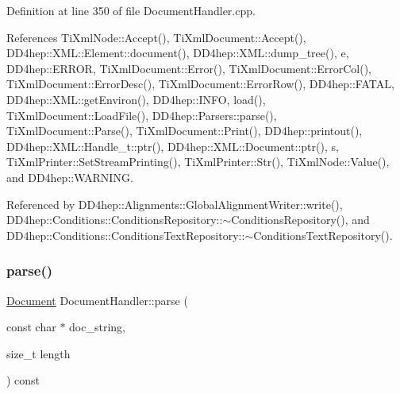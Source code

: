 Definition at line 350 of file Document\+Handler.\+cpp.



References Ti\+Xml\+Node\+::\+Accept(), Ti\+Xml\+Document\+::\+Accept(), D\+D4hep\+::\+X\+M\+L\+::\+Element\+::document(), D\+D4hep\+::\+X\+M\+L\+::dump\+\_\+tree(), e, D\+D4hep\+::\+E\+R\+R\+OR, Ti\+Xml\+Document\+::\+Error(), Ti\+Xml\+Document\+::\+Error\+Col(), Ti\+Xml\+Document\+::\+Error\+Desc(), Ti\+Xml\+Document\+::\+Error\+Row(), D\+D4hep\+::\+F\+A\+T\+AL, D\+D4hep\+::\+X\+M\+L\+::get\+Environ(), D\+D4hep\+::\+I\+N\+FO, load(), Ti\+Xml\+Document\+::\+Load\+File(), D\+D4hep\+::\+Parsers\+::parse(), Ti\+Xml\+Document\+::\+Parse(), Ti\+Xml\+Document\+::\+Print(), D\+D4hep\+::printout(), D\+D4hep\+::\+X\+M\+L\+::\+Handle\+\_\+t\+::ptr(), D\+D4hep\+::\+X\+M\+L\+::\+Document\+::ptr(), s, Ti\+Xml\+Printer\+::\+Set\+Stream\+Printing(), Ti\+Xml\+Printer\+::\+Str(), Ti\+Xml\+Node\+::\+Value(), and D\+D4hep\+::\+W\+A\+R\+N\+I\+NG.



Referenced by D\+D4hep\+::\+Alignments\+::\+Global\+Alignment\+Writer\+::write(), D\+D4hep\+::\+Conditions\+::\+Conditions\+Repository\+::$\sim$\+Conditions\+Repository(), and D\+D4hep\+::\+Conditions\+::\+Conditions\+Text\+Repository\+::$\sim$\+Conditions\+Text\+Repository().

\hypertarget{class_d_d4hep_1_1_x_m_l_1_1_document_handler_af330853c1eeef38dd17b20ad637b23ce}{}\label{class_d_d4hep_1_1_x_m_l_1_1_document_handler_af330853c1eeef38dd17b20ad637b23ce} 
\subsubsection{\texorpdfstring{parse()}{parse()}\hspace{0.1cm}{\footnotesize\ttfamily [1/2]}}
{\footnotesize\ttfamily \hyperlink{class_d_d4hep_1_1_x_m_l_1_1_document}{Document} Document\+Handler\+::parse (\begin{DoxyParamCaption}\item[{const char $\ast$}]{doc\+\_\+string,  }\item[{size\+\_\+t}]{length }\end{DoxyParamCaption}) const\hspace{0.3cm}{\ttfamily [virtual]}}



